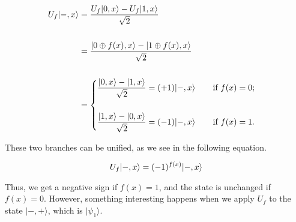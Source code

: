 \documentclass[12pt, letterpaper]{article}
\begin{document}
\begin{equation}
\begin{split}
U_f|-, x\rangle
&= \dfrac{U_f|0, x\rangle - U_f|1, x\rangle}{\sqrt{2}} \\
\vspace{1 mm}\\
&= \dfrac{|0 \oplus f(x), x\rangle - |1 \oplus f(x), x\rangle}{\sqrt{2}} \\
\vspace{1 mm}\\
&= \begin{cases}
    \dfrac{|0, x\rangle - |1, x\rangle}{\sqrt{2}}  = (+1)|-,x\rangle \text{ \hspace{5 mm} if } f(x) = 0;\\
    \vspace{1 mm}\\
    \dfrac{|1, x\rangle - |0, x\rangle}{\sqrt{2}}  = (-1)|-,x\rangle \text{ \hspace{5 mm} if } f(x) = 1.
\end{cases}
\end{split}
\end{equation}
\vspace{1 mm}

\noindent
These two branches can be unified, as we see in the following equation.

\begin{equation}
U_f|-, x\rangle = (-1)^{f(x)}|-, x\rangle
\vspace{3 mm}
\end{equation}

\noindent
Thus, we get a negative sign if $f(x) = 1$, and the state is unchanged if $f(x) = 0$. However, something interesting happens when we apply $U_f$ to the state $|-,+\rangle$, which is $|\psi_1\rangle$.
\end{document}
